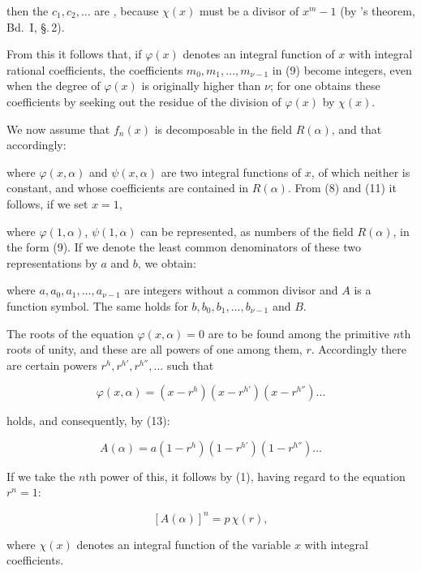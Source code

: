 then the $c_1, c_2, \ldots$ are , because $\chi(x)$ must be a divisor of $x^m - 1$ (by 's theorem, Bd.~I, \S.\,2).

From this it follows that, if $\varphi(x)$ denotes an integral function of $x$ with integral rational coefficients, the coefficients $m_0, m_1, \ldots, m_{\nu-1}$ in (9) become integers, even when the degree of $\varphi(x)$ is originally higher than $\nu$; for one obtains these coefficients by seeking out the residue of the division of $\varphi(x)$ by $\chi(x)$.

We now assume that $f_n(x)$ is decomposable in the field $R(\alpha)$, and that accordingly:


where $\varphi(x,\alpha)$ and $\psi(x,\alpha)$ are two integral functions of $x$, of which neither is constant, and whose coefficients are contained in $R(\alpha)$. From (8) and (11) it follows, if we set $x=1$,


where $\varphi(1,\alpha)$, $\psi(1,\alpha)$ can be represented, as numbers of the field $R(\alpha)$, in the form (9). If we denote the least common denominators of these two representations by $a$ and $b$, we obtain:


where $a, a_0, a_1, \ldots, a_{\nu-1}$ are integers without a common divisor and $A$ is a function symbol. The same holds for $b, b_0, b_1, \ldots, b_{\nu-1}$ and $B$.

The roots of the equation $\varphi(x,\alpha) = 0$ are to be found among the primitive $n$th roots of unity, and these are all powers of one among them, $r$. Accordingly there are certain powers $r^h, r^{h'}, r^{h''}, \ldots$ such that

\[
\varphi(x,\alpha) = (x - r^h)(x - r^{h'})(x - r^{h''}) \ldots
\]

holds, and consequently, by (13):

\[
A(\alpha) = a(1 - r^h)(1 - r^{h'})(1 - r^{h''}) \ldots
\]

If we take the $n$th power of this, it follows by (1), having regard to the equation $r^n = 1$:

\[
[A(\alpha)]^n = p\,\chi(r),
\]

where $\chi(x)$ denotes an integral function of the variable $x$ with integral coefficients.
